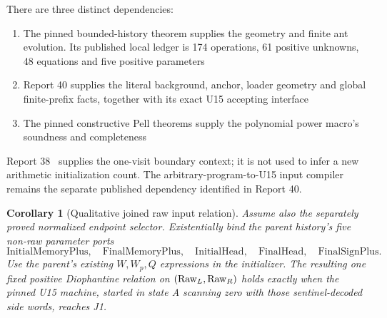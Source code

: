 \documentclass[11pt,letterpaper]{article}
\newtheorem{corollary}[theorem]{Corollary}
\theoremstyle{definition}\newtheorem{definition}[theorem]{Definition}
\theoremstyle{remark}\newtheorem{remark}[theorem]{Remark}
\newcommand{\IM}{\mathrm{InitialMemoryPlus}}\newcommand{\IH}{\mathrm{InitialHead}}
\begin{document}
There are three distinct dependencies:
\begin{enumerate}
\item The pinned bounded-history theorem supplies the geometry and finite ant evolution. Its published local ledger is 174 operations, 61 positive unknowns, 48 equations and five positive parameters
\item Report 40 supplies the literal background, anchor, loader geometry and global finite-prefix facts, together with its exact U15 accepting interface
\item The pinned constructive Pell theorems supply the polynomial power macro's soundness and completeness
\end{enumerate}
Report 38~\cite{ptr:ai:report38} supplies the one-visit boundary context; it is not used to infer a new arithmetic initialization count. The arbitrary-program-to-U15 input compiler remains the separate published dependency identified in Report 40.

\begin{corollary}[Qualitative joined raw input relation]\label{ptr:ai:cor:joined}
Assume also the separately proved normalized endpoint selector. Existentially bind the parent history's five non-raw parameter ports
\[
 \IM,\quad\mathrm{FinalMemoryPlus},\quad\IH,
 \quad\mathrm{FinalHead},\quad\mathrm{FinalSignPlus}.
\]
Use the parent's existing $W,W_p,Q$ expressions in the initializer. The resulting one fixed positive Diophantine relation on $(\mathrm{Raw}_L,\mathrm{Raw}_R)$ holds exactly when the pinned U15 machine, started in state A scanning zero with those sentinel-decoded side words, reaches J1.
\end{corollary}
\end{document}
